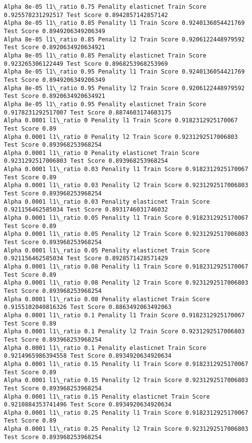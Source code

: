 \documentclass[11pt]{article}
\begin{document}
\begin{Verbatim}[commandchars=\\\{\}]
Alpha 8e-05 l1\_ratio 0.75 Penality elasticnet Train Score 0.925578231292517 Test Score 0.8942857142857142
Alpha 8e-05 l1\_ratio 0.85 Penality l1 Train Score 0.9240136054421769 Test Score 0.8949206349206349
Alpha 8e-05 l1\_ratio 0.85 Penality l2 Train Score 0.9206122448979592 Test Score 0.8920634920634921
Alpha 8e-05 l1\_ratio 0.85 Penality elasticnet Train Score 0.923265306122449 Test Score 0.8968253968253969
Alpha 8e-05 l1\_ratio 0.95 Penality l1 Train Score 0.9240136054421769 Test Score 0.8949206349206349
Alpha 8e-05 l1\_ratio 0.95 Penality l2 Train Score 0.9206122448979592 Test Score 0.8920634920634921
Alpha 8e-05 l1\_ratio 0.95 Penality elasticnet Train Score 0.9178231292517007 Test Score 0.8874603174603175
Alpha 0.0001 l1\_ratio 0 Penality l1 Train Score 0.9182312925170067 Test Score 0.89
Alpha 0.0001 l1\_ratio 0 Penality l2 Train Score 0.9231292517006803 Test Score 0.893968253968254
Alpha 0.0001 l1\_ratio 0 Penality elasticnet Train Score 0.9231292517006803 Test Score 0.893968253968254
Alpha 0.0001 l1\_ratio 0.03 Penality l1 Train Score 0.9182312925170067 Test Score 0.89
Alpha 0.0001 l1\_ratio 0.03 Penality l2 Train Score 0.9231292517006803 Test Score 0.893968253968254
Alpha 0.0001 l1\_ratio 0.03 Penality elasticnet Train Score 0.921156462585034 Test Score 0.8931746031746032
Alpha 0.0001 l1\_ratio 0.05 Penality l1 Train Score 0.9182312925170067 Test Score 0.89
Alpha 0.0001 l1\_ratio 0.05 Penality l2 Train Score 0.9231292517006803 Test Score 0.893968253968254
Alpha 0.0001 l1\_ratio 0.05 Penality elasticnet Train Score 0.921156462585034 Test Score 0.8928571428571429
Alpha 0.0001 l1\_ratio 0.08 Penality l1 Train Score 0.9182312925170067 Test Score 0.89
Alpha 0.0001 l1\_ratio 0.08 Penality l2 Train Score 0.9231292517006803 Test Score 0.893968253968254
Alpha 0.0001 l1\_ratio 0.08 Penality elasticnet Train Score 0.9155102040816326 Test Score 0.8863492063492063
Alpha 0.0001 l1\_ratio 0.1 Penality l1 Train Score 0.9182312925170067 Test Score 0.89
Alpha 0.0001 l1\_ratio 0.1 Penality l2 Train Score 0.9231292517006803 Test Score 0.893968253968254
Alpha 0.0001 l1\_ratio 0.1 Penality elasticnet Train Score 0.9214965986394558 Test Score 0.8934920634920634
Alpha 0.0001 l1\_ratio 0.15 Penality l1 Train Score 0.9182312925170067 Test Score 0.89
Alpha 0.0001 l1\_ratio 0.15 Penality l2 Train Score 0.9231292517006803 Test Score 0.893968253968254
Alpha 0.0001 l1\_ratio 0.15 Penality elasticnet Train Score 0.9210884353741496 Test Score 0.8934920634920634
Alpha 0.0001 l1\_ratio 0.25 Penality l1 Train Score 0.9182312925170067 Test Score 0.89
Alpha 0.0001 l1\_ratio 0.25 Penality l2 Train Score 0.9231292517006803 Test Score 0.893968253968254

\end{Verbatim}
\end{document}
